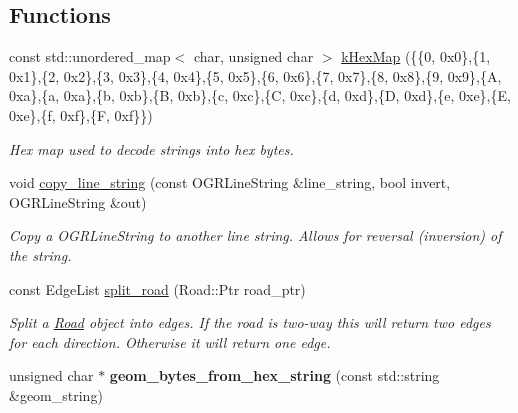 \subsection*{Functions}
\begin{DoxyCompactItemize}
\item 
const std\+::unordered\+\_\+map$<$ char, unsigned char $>$ \hyperlink{namespacegeo_a71d5ed41f25b14f0e5d60d4b4d314314}{k\+Hex\+Map} (\{\{\textquotesingle{}0\textquotesingle{}, 0x0\},\{\textquotesingle{}1\textquotesingle{}, 0x1\},\{\textquotesingle{}2\textquotesingle{}, 0x2\},\{\textquotesingle{}3\textquotesingle{}, 0x3\},\{\textquotesingle{}4\textquotesingle{}, 0x4\},\{\textquotesingle{}5\textquotesingle{}, 0x5\},\{\textquotesingle{}6\textquotesingle{}, 0x6\},\{\textquotesingle{}7\textquotesingle{}, 0x7\},\{\textquotesingle{}8\textquotesingle{}, 0x8\},\{\textquotesingle{}9\textquotesingle{}, 0x9\},\{\textquotesingle{}\+A\textquotesingle{}, 0xa\},\{\textquotesingle{}a\textquotesingle{}, 0xa\},\{\textquotesingle{}b\textquotesingle{}, 0xb\},\{\textquotesingle{}\+B\textquotesingle{}, 0xb\},\{\textquotesingle{}c\textquotesingle{}, 0xc\},\{\textquotesingle{}\+C\textquotesingle{}, 0xc\},\{\textquotesingle{}d\textquotesingle{}, 0xd\},\{\textquotesingle{}\+D\textquotesingle{}, 0xd\},\{\textquotesingle{}e\textquotesingle{}, 0xe\},\{\textquotesingle{}\+E\textquotesingle{}, 0xe\},\{\textquotesingle{}f\textquotesingle{}, 0xf\},\{\textquotesingle{}\+F\textquotesingle{}, 0xf\}\})\hypertarget{namespacegeo_a71d5ed41f25b14f0e5d60d4b4d314314}{}\label{namespacegeo_a71d5ed41f25b14f0e5d60d4b4d314314}

\begin{DoxyCompactList}\small\item\em Hex map used to decode strings into hex bytes. \end{DoxyCompactList}\item 
void \hyperlink{namespacegeo_aa39955dae49af31671bf8eac3e2d46d9}{copy\+\_\+line\+\_\+string} (const O\+G\+R\+Line\+String \&line\+\_\+string, bool invert, O\+G\+R\+Line\+String \&out)
\begin{DoxyCompactList}\small\item\em Copy a O\+G\+R\+Line\+String to another line string. Allows for reversal (inversion) of the string. \end{DoxyCompactList}\item 
const Edge\+List \hyperlink{namespacegeo_a4542eb0f5c3842f0bd813e0b3fdec00d}{split\+\_\+road} (Road\+::\+Ptr road\+\_\+ptr)
\begin{DoxyCompactList}\small\item\em Split a \hyperlink{classgeo_1_1Road}{Road} object into edges. If the road is two-\/way this will return two edges for each direction. Otherwise it will return one edge. \end{DoxyCompactList}\item 
unsigned char $\ast$ {\bfseries geom\+\_\+bytes\+\_\+from\+\_\+hex\+\_\+string} (const std\+::string \&geom\+\_\+string)\hypertarget{namespacegeo_a3e78cf1df4d58b711a25c5e6c9a85812}{}\label{namespacegeo_a3e78cf1df4d58b711a25c5e6c9a85812}


\end{DoxyCompactItemize}
